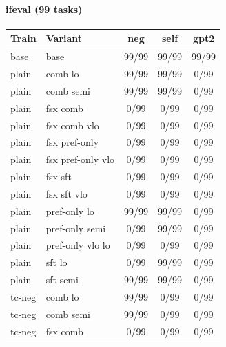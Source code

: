 \documentclass[10pt,landscape]{article}
\begin{document}
\paragraph{ifeval (99 tasks)}
\begin{tabular}{llccc}
\toprule
Train & Variant & neg & self & gpt2 \\
\midrule
base & base & \cellcolor{done}99/99 & \cellcolor{done}99/99 & \cellcolor{done}99/99 \\
plain & comb lo & \cellcolor{done}99/99 & \cellcolor{done}99/99 & \cellcolor{missing}0/99 \\
plain & comb semi & \cellcolor{done}99/99 & \cellcolor{done}99/99 & \cellcolor{missing}0/99 \\
plain & fsx comb & \cellcolor{missing}0/99 & \cellcolor{missing}0/99 & \cellcolor{missing}0/99 \\
plain & fsx comb vlo & \cellcolor{missing}0/99 & \cellcolor{missing}0/99 & \cellcolor{missing}0/99 \\
plain & fsx pref-only & \cellcolor{missing}0/99 & \cellcolor{missing}0/99 & \cellcolor{missing}0/99 \\
plain & fsx pref-only vlo & \cellcolor{missing}0/99 & \cellcolor{missing}0/99 & \cellcolor{missing}0/99 \\
plain & fsx sft & \cellcolor{missing}0/99 & \cellcolor{missing}0/99 & \cellcolor{missing}0/99 \\
plain & fsx sft vlo & \cellcolor{missing}0/99 & \cellcolor{missing}0/99 & \cellcolor{missing}0/99 \\
plain & pref-only lo & \cellcolor{done}99/99 & \cellcolor{done}99/99 & \cellcolor{missing}0/99 \\
plain & pref-only semi & \cellcolor{missing}0/99 & \cellcolor{done}99/99 & \cellcolor{missing}0/99 \\
plain & pref-only vlo lo & \cellcolor{missing}0/99 & \cellcolor{missing}0/99 & \cellcolor{missing}0/99 \\
plain & sft lo & \cellcolor{missing}0/99 & \cellcolor{done}99/99 & \cellcolor{missing}0/99 \\
plain & sft semi & \cellcolor{done}99/99 & \cellcolor{done}99/99 & \cellcolor{missing}0/99 \\
tc-neg & comb lo & \cellcolor{done}99/99 & \cellcolor{missing}0/99 & \cellcolor{missing}0/99 \\
tc-neg & comb semi & \cellcolor{done}99/99 & \cellcolor{missing}0/99 & \cellcolor{missing}0/99 \\
tc-neg & fsx comb & \cellcolor{missing}0/99 & \cellcolor{missing}0/99 & \cellcolor{missing}0/99 \\

\end{tabular}
\end{document}
